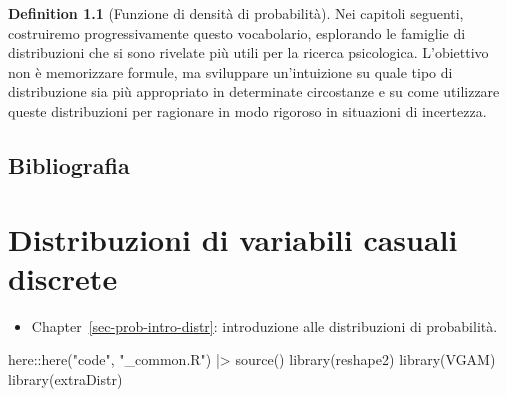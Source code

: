 \documentclass[
  letterpaper,
  DIV=11,
  numbers=noendperiod,
  oneside]{scrreprt}
\newenvironment{Shaded}{\begin{snugshade}}{\end{snugshade}}
\newcommand{\FunctionTok}[1]{\textcolor[rgb]{0.28,0.35,0.67}{#1}}
\newcommand{\NormalTok}[1]{\textcolor[rgb]{0.00,0.23,0.31}{#1}}
\newcommand{\SpecialCharTok}[1]{\textcolor[rgb]{0.37,0.37,0.37}{#1}}
\newcommand{\StringTok}[1]{\textcolor[rgb]{0.13,0.47,0.30}{#1}}
\providecommand{\tightlist}{%
  \setlength{\itemsep}{0pt}\setlength{\parskip}{0pt}}
\theoremstyle{definition}
\theoremstyle{plain}
\theoremstyle{definition}
\newtheorem{definition}{Definition}[chapter]
\theoremstyle{remark}
\begin{document}
\begin{definition}[Funzione di densità di
probabilità]
Nei capitoli seguenti, costruiremo progressivamente questo vocabolario,
esplorando le famiglie di distribuzioni che si sono rivelate più utili
per la ricerca psicologica. L'obiettivo non è memorizzare formule, ma
sviluppare un'intuizione su quale tipo di distribuzione sia più
appropriato in determinate circostanze e su come utilizzare queste
distribuzioni per ragionare in modo rigoroso in situazioni di
incertezza.

\section*{Bibliografia}\label{bibliografia-7}


\chapter{Distribuzioni di variabili casuali
discrete}\label{sec-prob-discr-distr}

\begin{tcolorbox}[enhanced jigsaw, arc=.35mm, breakable, colbacktitle=quarto-callout-tip-color!10!white, opacityback=0, toprule=.15mm, rightrule=.15mm, colback=white, opacitybacktitle=0.6, leftrule=.75mm, coltitle=black, bottomtitle=1mm, left=2mm, toptitle=1mm, title=\textcolor{quarto-callout-tip-color}{\faLightbulb}\hspace{0.5em}{Prerequisiti}, titlerule=0mm, bottomrule=.15mm, colframe=quarto-callout-tip-color-frame]

\begin{itemize}
\tightlist
\item
  Chapter~\ref{sec-prob-intro-distr}: introduzione alle distribuzioni di
  probabilità.
\end{itemize}

\end{tcolorbox}

\begin{tcolorbox}[enhanced jigsaw, arc=.35mm, breakable, colbacktitle=quarto-callout-caution-color!10!white, opacityback=0, toprule=.15mm, rightrule=.15mm, colback=white, opacitybacktitle=0.6, leftrule=.75mm, coltitle=black, bottomtitle=1mm, left=2mm, toptitle=1mm, title=\textcolor{quarto-callout-caution-color}{\faFire}\hspace{0.5em}{Preparazione del Notebook}, titlerule=0mm, bottomrule=.15mm, colframe=quarto-callout-caution-color-frame]

\begin{Shaded}
\begin{Highlighting}[]
\NormalTok{here}\SpecialCharTok{::}\FunctionTok{here}\NormalTok{(}\StringTok{"code"}\NormalTok{, }\StringTok{"\_common.R"}\NormalTok{) }\SpecialCharTok{|\textgreater{}} 
  \FunctionTok{source}\NormalTok{()}
\FunctionTok{library}\NormalTok{(reshape2)}
\FunctionTok{library}\NormalTok{(VGAM)}
\FunctionTok{library}\NormalTok{(extraDistr)}
\end{Highlighting}
\end{Shaded}


\end{tcolorbox}
\end{definition}
\end{document}
